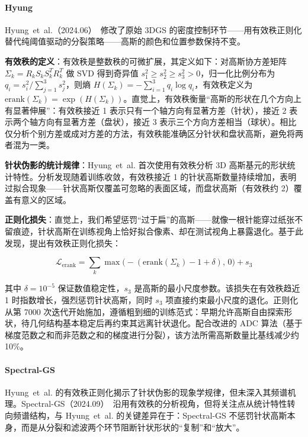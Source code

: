 \paragraph{Hyung}
Hyung~et~al.（2024.06）~\cite{2406_11672}修改了原始 3DGS 的密度控制环节——用有效秩正则化替代纯阈值驱动的分裂策略——高斯的颜色和位置参数保持不变。

\textbf{有效秩的定义}：有效秩是整数秩的可微扩展，其定义如下：对高斯协方差矩阵 $\Sigma_k = R_k S_k S_k^T R_k^T$ 做 SVD 得到奇异值 $s_1^2 \geq s_2^2 \geq s_3^2 > 0$，归一化比例分布为 $q_i = s_i^2 / \sum_{j=1}^{3} s_j^2$，则熵 $H(\Sigma_k) = -\sum_{i=1}^{3} q_i \log q_i$，有效秩定义为 $\text{erank}(\Sigma_k) = \exp(H(\Sigma_k))$。直觉上，有效秩衡量``高斯的形状在几个方向上有显著伸展''：有效秩接近 1 表示只有一个轴方向有显著方差（针状），接近 2 表示两个轴方向有显著方差（盘状），接近 3 表示三个方向方差相当（球状）。相比仅分析个别方差或成对方差的方法，有效秩能准确区分针状和盘状高斯，避免将两者混为一类。

\textbf{针状伪影的统计规律}：Hyung~et~al. 首次使用有效秩分析 3D 高斯基元的形状统计特性。分析发现随着训练收敛，有效秩接近 1 的针状高斯数量持续增加，表明过拟合现象——针状高斯仅覆盖可忽略的表面区域，而盘状高斯（有效秩约 2）覆盖有意义的区域。

\textbf{正则化损失}：直觉上，我们希望惩罚``过于扁''的高斯——就像一根针能穿过纸张不留痕迹，针状高斯在训练视角上恰好拟合像素、却在测试视角上暴露退化。基于此发现，提出有效秩正则化损失：

\begin{equation}
\mathcal{L}_{\text{erank}} = \sum_k \max\!\bigl(-(\text{erank}(\Sigma_k) - 1 + \delta),\, 0\bigr) + s_3
\label{eq:02_erank}
\end{equation}

其中 $\delta = 10^{-5}$ 保证数值稳定性，$s_3$ 是高斯的最小尺度参数。该损失在有效秩趋近 1 时指数增长，强烈惩罚针状高斯，同时 $s_3$ 项直接约束最小尺度的退化。正则化从第 7000 次迭代开始施加，遵循粗到细的训练范式：早期允许高斯自由探索形状，待几何结构基本稳定后再约束其远离针状退化。配合改进的 ADC 算法（基于梯度范数之和而非范数之和的梯度进行分裂），该方法所需高斯数量比基线减少约 10\%。

\paragraph{Spectral-GS}
Hyung~et~al. 的有效秩正则化揭示了针状伪影的现象学规律，但未深入其频谱机理。Spectral-GS（2024.09）~\cite{2409_12771}沿用有效秩的分析视角，但将关注点从统计特性转向频谱结构，与 Hyung~et~al. 的关键差异在于：Spectral-GS 不惩罚针状高斯本身，而是从分裂和滤波两个环节阻断针状形状的``复制''和``放大''。

